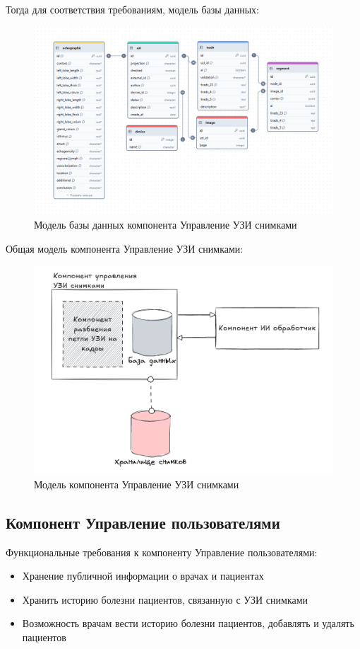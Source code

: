 Тогда для соответствия требованиям, модель базы данных:
\begin{figure}[H]%
	\begin{center}
		\includegraphics[width=.9\columnwidth]{./img/new/uzi_db.png}%
	\end{center}
	\caption{Модель базы данных компонента Управление УЗИ снимками}%
	\label{pic:uzi_db}%
\end{figure}


Общая модель компонента Управление УЗИ снимками:
\begin{figure}[H]%
	\begin{center}
		\includegraphics[width=.6\columnwidth]{./img/new/uzi_model.png}%
	\end{center}
	\caption{Модель компонента Управление УЗИ снимками}%
	\label{pic:uzi_model}%
\end{figure}

\subsection{Компонент Управление пользователями}

Функциональные требования к компоненту Управление пользователями:
\begin{itemize}
  \item Хранение публичной информации о врачах и пациентах
  \item Хранить историю болезни пациентов, связанную с УЗИ снимками
  \item Возможность врачам вести историю болезни пациентов, добавлять и удалять пациентов
\end{itemize}

